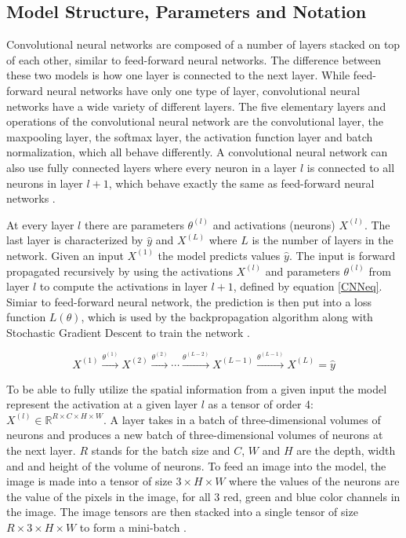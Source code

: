 \documentclass[a4paper, twoside]{article}
\begin{document}
\subsection{Model Structure, Parameters and Notation}
Convolutional neural networks are composed of a number of layers stacked on top of each other, similar to feed-forward neural networks. The difference between these two models is how one layer is connected to the next layer. While feed-forward neural networks have only one type of layer, convolutional neural networks have a wide variety of different layers. The five elementary layers and operations of the convolutional neural network are the convolutional layer, the maxpooling layer, the softmax layer, the activation function layer and batch normalization, which all behave differently. A convolutional neural network can also use fully connected layers where every neuron in a layer $l$ is connected to all neurons in layer $l+1$, which behave exactly the same as feed-forward neural networks \cite{cs231n} \cite{convmath} \cite{convarithmetic}.

At every layer $l$ there are parameters $\theta^{(l)}$ and activations (neurons) $X^{(l)}$. The last layer is characterized by $\hat{y}$ and $X^{(L)}$ where $L$ is the number of layers in the network. Given an input $X^{(1)}$ the model predicts values $\hat{y}$. The input is forward propagated recursively by using the activations $X^{(l)}$ and parameters $\theta^{(l)}$ from layer $l$ to compute the activations in layer $l+1$, defined by equation \eqref{CNNeq}. Simiar to feed-forward neural network, the prediction is then put into a loss function $L(\theta)$, which is used by the backpropagation algorithm along with Stochastic Gradient Descent to train the network \cite{cs231n} \cite{convmath}.

\begin{equation}\label{CNNeq}
X^{(1)} \xrightarrow{\theta^{(1)}} X^{(2)}  \xrightarrow{\theta^{(2)}} \cdots  \xrightarrow{\theta^{(L-2)}} X^{(L-1)}  \xrightarrow{\theta^{(L-1)}} X^{(L)} = \hat{y}
\end{equation}

To be able to fully utilize the spatial information from a given input the model represent the activation at a given layer $l$ as a tensor of order 4: $X^{(l)} \in \mathbb{R}^{R \times C  \times H \times W}$. A layer takes in a batch of three-dimensional volumes of neurons and produces a new batch of three-dimensional volumes of neurons at the next layer. $R$ stands for the batch size and $C$, $W$ and $H$ are the depth, width and and height of the volume of neurons. To feed an image into the model, the image is made into a tensor of size $3 \times H \times W$ where the values of the neurons are the value of the pixels in the image, for all 3 red, green and blue color channels in the image. The image tensors are then stacked into a single tensor of size $R \times 3 \times H \times W$ to form a mini-batch \cite{cs231n}.
\end{document}
